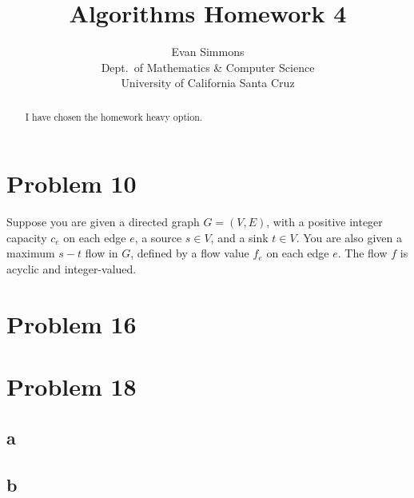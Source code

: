 \documentclass{amsart}
\theoremstyle{definition}
\theoremstyle{remark}
\numberwithin{equation}{section}
\begin{document}
\title[]{Algorithms Homework 4}%
\author{Evan Simmons \\
        Dept.\ of Mathematics \& Computer Science \\ University of California Santa Cruz}%
\renewcommand{\abstractname}{Homework Option}
\begin{abstract}
I have chosen the homework heavy option.
\end{abstract}
\maketitle
\section{Problem 10}
Suppose you are given a directed graph $G=(V,E)$, with a positive integer capacity $c_e$ on each edge $e$, a source $s \in V$, and a sink $t\in V$. You are also given a maximum $s-t$ flow in $G$, defined by a flow value $f_e$ on each edge $e$. The flow $f$ is acyclic and integer-valued.



\section{Problem 16}
\section{Problem 18}

\subsection*{a}
\subsection*{b}
\end{document}
